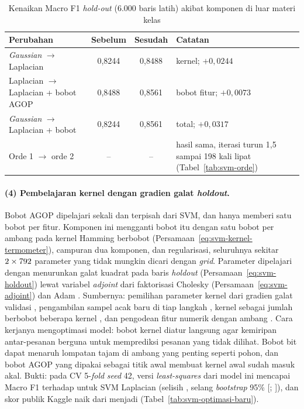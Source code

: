 \begin{table}[H]
	\centering
	\caption{Kenaikan Macro F1 \textit{hold-out} (6.000 baris latih) akibat komponen di luar materi kelas}
	\label{tab:svm-optimasi-bukti}
	\small
	\begin{tabularx}{\textwidth}{l c c Y}
		\toprule
		\textbf{Perubahan} & \textbf{Sebelum} & \textbf{Sesudah} & \textbf{Catatan} \\
		\midrule
		\textit{Gaussian} $\to$ Laplacian & 0,8244 & 0,8488 & kernel; $+0{,}0244$ \\
		Laplacian $\to$ Laplacian + bobot AGOP & 0,8488 & 0,8561 & bobot fitur; $+0{,}0073$ \\
		\textit{Gaussian} $\to$ Laplacian + bobot & 0,8244 & 0,8561 & total; $+0{,}0317$ \\
		Orde 1 $\to$ orde 2 & -- & -- & hasil sama, iterasi turun 1,5 sampai 198 kali lipat (Tabel~\ref{tab:svm-orde}) \\
		\bottomrule
	\end{tabularx}
\end{table}

\paragraph{(4) Pembelajaran kernel dengan gradien galat \textit{holdout}.} Bobot AGOP dipelajari sekali dan terpisah dari SVM, dan hanya memberi satu bobot per fitur. Komponen ini mengganti bobot itu dengan satu bobot per ambang pada kernel Hamming berbobot (Persamaan~\eqref{eq:svm-kernel-termometer}), campuran dua komponen, dan regularisasi, seluruhnya sekitar $2\times792{}$ parameter yang tidak mungkin dicari dengan \textit{grid}. Parameter dipelajari dengan menurunkan galat kuadrat pada baris \textit{holdout} (Persamaan~\eqref{eq:svm-holdout}) lewat variabel \textit{adjoint} dari faktorisasi Cholesky (Persamaan~\eqref{eq:svm-adjoint}) dan Adam \cite{kingma2015adam}. Sumbernya: pemilihan parameter kernel dari gradien galat validasi \cite{chapelle2002multiparam}, pengambilan sampel acak baru di tiap langkah \cite{owhadi2019kernelflows}, kernel sebagai jumlah berbobot beberapa kernel \cite{lanckriet2004kernel}, dan pengodean fitur numerik dengan ambang \cite{gorishniy2022embeddings}. Cara kerjanya mengoptimasi model: bobot kernel diatur langsung agar kemiripan antar-pesanan berguna untuk memprediksi pesanan yang tidak dilihat. Bobot bit dapat menaruh lompatan tajam di ambang yang penting seperti pohon, dan bobot AGOP yang dipakai sebagai titik awal membuat kernel awal sudah masuk akal. Bukti: pada CV 5-\textit{fold} \textit{seed} 42, versi \textit{least-squares} dari model ini mencapai Macro F1 \SVMLSCV{} terhadap \SVMLamaCV{} untuk SVM Laplacian (selisih \SVMLSSelisih{}, selang \textit{bootstrap} 95\% [\SVMLSSelisihBawah{}; \SVMLSSelisihAtas{}]), dan skor publik Kaggle naik dari \SVMLamaPublik{} menjadi \SVMLSPublik{} (Tabel~\ref{tab:svm-optimasi-baru}).

